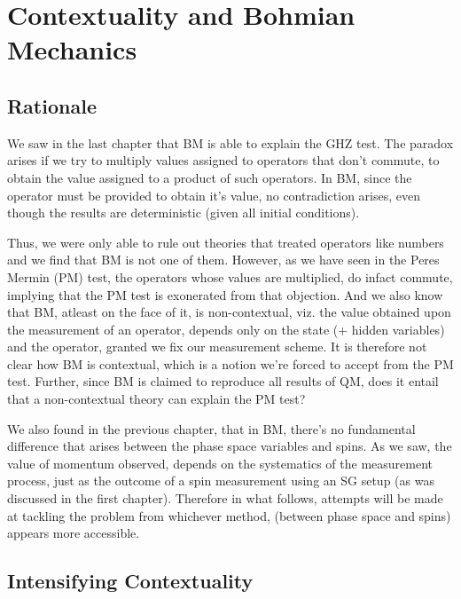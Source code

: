 %

\chapter{Contextuality and Bohmian Mechanics}


\section{Rationale}

We saw in the last chapter that BM is able to explain the GHZ test.
The paradox arises if we try to multiply values assigned to operators
that don't commute, to obtain the value assigned to a product of such
operators. In BM, since the operator must be provided to obtain it's
value, no contradiction arises, even though the results are deterministic
(given all initial conditions). %

Thus, we were only able to rule out theories that treated operators
like numbers and we find that BM is not one of them. However, as we
have seen in the Peres Mermin (PM) test, the operators whose values
are multiplied, do infact commute, implying that the PM test is exonerated
from that objection. And we also know that BM, atleast on the face
of it, is non-contextual, viz. the value obtained upon the measurement
of an operator, depends only on the state (+ hidden variables) and
the operator, granted we fix our measurement scheme. It is therefore
not clear how BM is contextual, which is a notion we're forced to
accept from the PM test. Further, since BM is claimed to reproduce
all results of QM, does it entail that a non-contextual theory can
explain the PM test?

We also found in the previous chapter, that in BM, there's no fundamental
difference that arises between the phase space variables and spins.
As we saw, the value of momentum observed, depends on the systematics
of the measurement process, just as the outcome of a spin measurement
using an SG setup (as was discussed in the first chapter). Therefore
in what follows, attempts will be made at tackling the problem from
whichever method, (between phase space and spins) appears more accessible. 


\section{Intensifying Contextuality}

